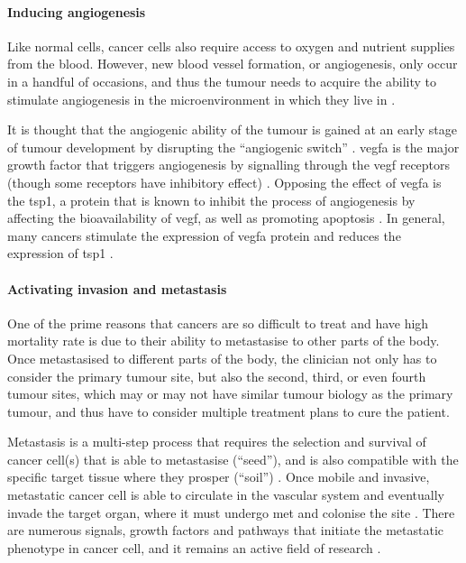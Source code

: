 \paragraph{Inducing angiogenesis}

\noindent
Like normal cells, cancer cells also require access to oxygen and nutrient supplies from the blood.
However, new blood vessel formation, or angiogenesis, only occur in a handful of occasions, and thus the tumour needs to acquire the ability to stimulate angiogenesis in the microenvironment in which they live in \citep{Hanahan2011}.

It is thought that the angiogenic ability of the tumour is gained at an early stage of tumour development by disrupting the ``angiogenic switch'' \citep{Hanahan2011}.
\Gls{vegfa} is the major growth factor that triggers angiogenesis by signalling through the \acrshort{vegf} receptors (though some receptors have inhibitory effect) \citep{Yancopoulos2000}.
Opposing the effect of \Gls{vegfa} is the \gls{tsp1}, a protein that is known to inhibit the process of angiogenesis by affecting the bioavailability of \acrshort{vegf}, as well as promoting apoptosis \citep{Kazerounian2008}.
In general, many cancers stimulate the expression of \gls{vegfa} protein and reduces the expression of \gls{tsp1} \citep{Kazerounian2008}.

\paragraph{Activating invasion and metastasis}

\noindent
One of the prime reasons that cancers are so difficult to treat and have high mortality rate is due to their ability to metastasise to other parts of the body.
Once metastasised to different parts of the body, the clinician not only has to consider the primary tumour site, but also the second, third, or even fourth tumour sites, which may or may not have similar tumour biology as the primary tumour, and thus have to consider multiple treatment plans to cure the patient.

Metastasis is a multi-step process that requires the selection and survival of cancer cell(s) that is able to metastasise (``seed''), and is also compatible with the specific target tissue where they prosper (``soil'') \citep{Talmadge2010}.
Once mobile and invasive, metastatic cancer cell is able to circulate in the vascular system and eventually invade the target organ, where it must undergo \gls{met} and colonise the site \citep{Hanahan2011,Kalluri2009}.
There are numerous signals, growth factors and pathways that initiate the metastatic phenotype in cancer cell, and it remains an active field of research \citep{Hanahan2011,Kalluri2009}.

